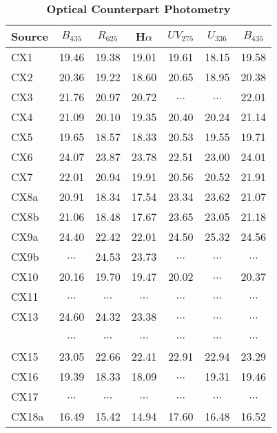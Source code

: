 \documentclass[fleqn,usenatbib]{mnras}
\newcommand{\B}{\mbox{$B_{435}$}}
\newcommand{\R}{\mbox{$R_{625}$}}
\newcommand{\ha}{\mbox{H$\alpha$}}
\newcommand{\UV}{\mbox{$UV_{275}$}}
\newcommand{\U}{\mbox{$U_{336}$}}
\newcommand\nodata{ ~$\cdots$~ }%
\newcommand{\nd}{\nodata}
\newcommand{\mspf}[1]{{\color{black}{#1}}}
\begin{document}
\begin{table}
\caption{\textbf{Optical Counterpart Photometry}\label{t:photometry}}
\begin{tabular}{lcccccc}
\hline
Source & 
\B & 
\R & 
\ha &
\UV & 
\U  &
\B  \\
\hline
%
%                                                            
CX1    &  19.46  &  19.38  &  19.01  &  19.61  &  18.15  &  19.58  \\
CX2    &  20.36  &  19.22  &  18.60  &  20.65  &  18.95  &  20.38  \\
CX3    &  21.76  &  20.97  &  20.72  &  \nd    &  \nd    &  22.01  \\
CX4    &  21.09  &  20.10  &  19.35  &  20.40  &  20.24  &  21.14  \\
CX5    &  19.65  &  18.57  &  18.33  &  20.53  &  19.55  &  19.71  \\
CX6    &  24.07  &  23.87  &  23.78  &  22.51  &  23.00  &  24.01  \\
CX7    &  22.01  &  20.94  &  19.91  &  20.56  &  20.52  &  21.91  \\
CX8a   &  20.91  &  18.34  &  17.54  &  23.34  &  23.62  &  21.07  \\
CX8b   &  21.06  &  18.48  &  17.67  &  23.65  &  23.05  &  21.18  \\
CX9a   &  24.40  &  22.42  &  22.01  &  24.50  &  25.32  &  24.56  \\ 
CX9b   &  \nd    &  24.53  &  23.73  &  \nd    &  \nd    &  \nd    \\
CX10   &  20.16  &  19.70  &  19.47  &  20.02  &  \nd    &  20.37  \\
CX11   &  \nd    &  \nd    &  \nd    &  \nd    &  \nd    &  \nd    \\
CX13   &  24.60  &  24.32  &  23.38  &  \nd    &  \nd    &  \nd    \\
\mspf{CX14}&  \nd    &  \nd    &  \nd    &  \nd    &   \nd   &  \nd    \\
CX15   &  23.05  &  22.66  &  22.41  &  22.91  &  22.94  &  23.29  \\
CX16   &  19.39  &  18.33  &  18.09  &  \nd    &  19.31  &  19.46  \\
CX17   &  \nd    &  \nd    &  \nd    &  \nd    &  \nd    &  \nd    \\
CX18a  &  16.49  &  15.42  &  14.94  &  17.60  &  16.48  &  16.52  \\

\end{tabular}
\end{table}
\end{document}
